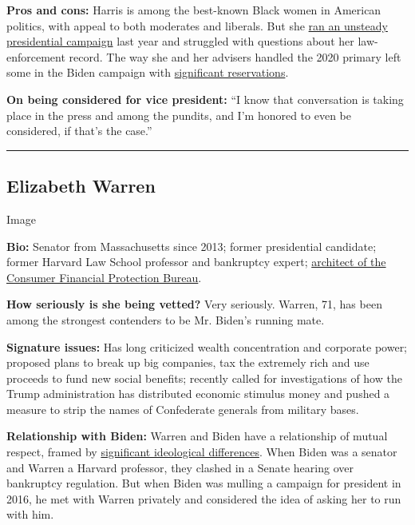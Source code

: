 \textbf{Pros and cons:} Harris is among the best-known Black women in
American politics, with appeal to both moderates and liberals. But she
\href{https://www.nytimes3xbfgragh.onion/2019/11/29/us/politics/kamala-harris-2020.html}{ran
an unsteady presidential campaign} last year and struggled with
questions about her law-enforcement record. The way she and her advisers
handled the 2020 primary left some in the Biden campaign with
\href{https://www.nytimes3xbfgragh.onion/2020/07/31/us/elections/biden-vs-trump.html}{significant
reservations}.

\textbf{On being considered for vice president:} ``I know that
conversation is taking place in the press and among the pundits, and I'm
honored to even be considered, if that's the case.''

\begin{center}\rule{0.5\linewidth}{\linethickness}\end{center}

\hypertarget{elizabeth-warren}{%
\subsection{Elizabeth Warren}\label{elizabeth-warren}}

Image

\textbf{Bio:} Senator from Massachusetts since 2013; former presidential
candidate; former Harvard Law School professor and bankruptcy expert;
\href{https://www.nytimes3xbfgragh.onion/2019/09/21/us/politics/elizabeth-warren.html}{architect
of the Consumer Financial Protection Bureau}.

\textbf{How seriously is she being vetted?} Very seriously. Warren, 71,
has been among the strongest contenders to be Mr. Biden's running mate.

\textbf{Signature issues:} Has long criticized wealth concentration and
corporate power; proposed plans to break up big companies, tax the
extremely rich and use proceeds to fund new social benefits; recently
called for investigations of how the Trump administration has
distributed economic stimulus money and pushed a measure to strip the
names of Confederate generals from military bases.

\textbf{Relationship with Biden:} Warren and Biden have a relationship
of mutual respect, framed by
\href{https://www.nytimes3xbfgragh.onion/2020/05/22/us/politics/democrats-biden-warren-ticket.html}{significant
ideological differences}. When Biden was a senator and Warren a Harvard
professor, they clashed in a Senate hearing over bankruptcy regulation.
But when Biden was mulling a campaign for president in 2016, he met with
Warren privately and considered the idea of asking her to run with him.

